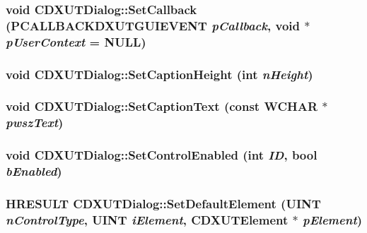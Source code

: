 \hypertarget{class_c_d_x_u_t_dialog_a082c0600d7f516952cc4a935475f3c49}{
\subsubsection[{SetCallback}]{\setlength{\rightskip}{0pt plus 5cm}void CDXUTDialog::SetCallback (PCALLBACKDXUTGUIEVENT {\em pCallback}, \/  void $\ast$ {\em pUserContext} = {\ttfamily NULL})}}
\label{class_c_d_x_u_t_dialog_a082c0600d7f516952cc4a935475f3c49}
\hypertarget{class_c_d_x_u_t_dialog_a548f7b6caf0780730978344b746351eb}{
\subsubsection[{SetCaptionHeight}]{\setlength{\rightskip}{0pt plus 5cm}void CDXUTDialog::SetCaptionHeight ({\bf int} {\em nHeight})}}
\label{class_c_d_x_u_t_dialog_a548f7b6caf0780730978344b746351eb}
\hypertarget{class_c_d_x_u_t_dialog_abdf008c43c24525341ca8db2742eb042}{
\subsubsection[{SetCaptionText}]{\setlength{\rightskip}{0pt plus 5cm}void CDXUTDialog::SetCaptionText (const WCHAR $\ast$ {\em pwszText})}}
\label{class_c_d_x_u_t_dialog_abdf008c43c24525341ca8db2742eb042}
\hypertarget{class_c_d_x_u_t_dialog_a38467fd37877a472214cc2b6e95c0059}{
\subsubsection[{SetControlEnabled}]{\setlength{\rightskip}{0pt plus 5cm}void CDXUTDialog::SetControlEnabled ({\bf int} {\em ID}, \/  bool {\em bEnabled})}}
\label{class_c_d_x_u_t_dialog_a38467fd37877a472214cc2b6e95c0059}
\hypertarget{class_c_d_x_u_t_dialog_ad509ffcb58000556545e337cbba2e656}{
\subsubsection[{SetDefaultElement}]{\setlength{\rightskip}{0pt plus 5cm}HRESULT CDXUTDialog::SetDefaultElement (UINT {\em nControlType}, \/  UINT {\em iElement}, \/  {\bf CDXUTElement} $\ast$ {\em pElement})}}

